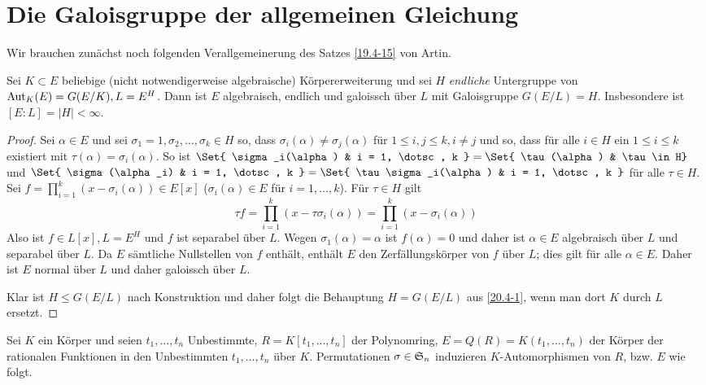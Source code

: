 \section{Die Galoisgruppe der allgemeinen Gleichung}

Wir brauchen zunächst noch folgenden Verallgemeinerung des Satzes \ref{19.4-15} von Artin.

\begin{st} \label{20.4-1}
	Sei $K \subset E$ beliebige (nicht notwendigerweise algebraische) Körpererweiterung und sei $H$ \emph{endliche} Untergruppe von $\Aut_K(E) = G(E / K), L = E^H$.
	Dann ist $E$ algebraisch, endlich und galoissch über $L$ mit Galoisgruppe $G(E / L) = H$.
	Insbesondere ist $[E : L] = |H| < \infty$.
	\begin{proof}
		Sei $\alpha \in E$ und sei $\sigma_1 = 1, \sigma_2, \dotsc, \sigma_k \in H$ so, dass $\sigma_i(\alpha) \neq \sigma_j(\alpha)$ für $1 \le i, j \le k, i \neq j$ und so, dass für alle $i \in H$ ein $1 \le i \le k$ existiert mit $\tau(\alpha) = \sigma_i(\alpha)$.
		So ist $\Set{ \sigma_i(\alpha) & i = 1, \dotsc, k } = \Set{ \tau(\alpha) & \tau \in H}$ und $\Set{ \sigma(\alpha_i) & i = 1, \dotsc, k } = \Set{ \tau \sigma_i(\alpha) & i = 1, \dotsc, k }$ für alle $\tau \in H$.
		Sei $f = \prod_{i=1}^k (x - \sigma_i(\alpha)) \in E[x]$ ($\sigma_i(\alpha) \in E$ für $i = 1, \dotsc, k$).
		Für $\tau \in H$ gilt
		\[
			\tau f = \prod_{i=1}^k (x - \tau \sigma_i(\alpha))
			= \prod_{i=1}^k (x - \sigma_i(\alpha))
		\]
		Also ist $f \in L[x], L = E^H$ und $f$ ist separabel über $L$.
		Wegen $\sigma_1(\alpha) = \alpha$ ist $f(\alpha) = 0$ und daher ist $\alpha \in E$ algebraisch über $L$ und separabel über $L$.
		Da $E$ sämtliche Nullstellen von $f$ enthält, enthält $E$ den Zerfällungskörper von $f$ über $L$;
		dies gilt für alle $\alpha \in E$.
		Daher ist $E$ normal über $L$ und daher galoissch über $L$.

		Klar ist $H \le G(E / L)$ nach Konstruktion und daher folgt die Behauptung $H = G(E / L)$ aus \ref{20.4-1}, wenn man dort $K$ durch $L$ ersetzt.
	\end{proof}
\end{st}

Sei $K$ ein Körper und seien $t_1, \dotsc, t_n$ Unbestimmte, $R = K[t_1, \dotsc, t_n]$ der Polynomring, $E = Q(R) = K(t_1, \dotsc, t_n)$ der Körper der rationalen Funktionen in den Unbestimmten $t_1, \dotsc, t_n$ über $K$.
Permutationen $\sigma \in \S_n$ induzieren $K$-Automorphismen von $R$, bzw. $E$ wie folgt.

